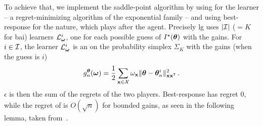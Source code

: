 
To achieve that, we implement the saddle-point algorithm by using \AH for the learner -- a regret-minimizing algorithm of the exponential family -- and using best-response for the nature, which plays after the agent. Precisely \gls{lg} uses $|\mathcal{I}|$ ($=K$ for \gls{bai}) learners $\mathcal{L}_{\boldsymbol \omega}^i$, one for each possible guess of $I^\star({\boldsymbol \theta})$ with the gains. For $i\in\mathcal{I}$, the learner $\mathcal{L}_{\boldsymbol \omega}^i$ is an \AH on the probability simplex $\Sigma_K$ with the gains (when the guess is $i$)
\[
    g_n^{\boldsymbol \theta}({\boldsymbol \omega}) = \frac{1}{2} \sum_{{\bf x}\in\mathcal{X}}  \omega_{{\bf x}} \Vert {\boldsymbol \theta} - {\boldsymbol \theta}_n^i \Vert^2_{{\bf x} {\bf x}^\mathsf{\scriptscriptstyle T}}\,.
\]
$\epsilon$ is then the sum of the regrets of the two players. Best-response has regret 0, while the regret of \AH is $O(\sqrt{n})$ for bounded gains, as seen in the following lemma, taken from~\citet{derooij2014hedge}.

